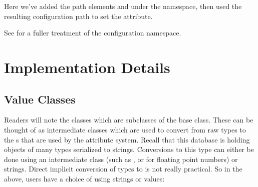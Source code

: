 \documentclass[letterpaper,10pt,english]{sphinxmanual}
\renewcommand{\sphinxcode}[1]{\texttt{\small{#1}}}
\begin{document}
Here we’ve added the path elements \sphinxcode{} and \sphinxcode{} under
the \sphinxcode{} namespace, then used the resulting configuration path
to set the attribute.

See {\hyperref[\detokenize{object-names:object-names}]{}} for a fuller treatment of the  configuration namespace.


\section{Implementation Details}
\label{\detokenize{attributes:implementation-details}}

\subsection{Value Classes}
\label{\detokenize{attributes:value-classes}}
Readers will note the \sphinxcode{} classes which are subclasses of the
\sphinxcode{} base class. These can be thought of as
intermediate classes which are used to convert from raw types to the
\sphinxcode{}s that are used by the attribute system.
Recall that this database is holding objects of many types serialized
to strings. Conversions to this type can either be done using
an intermediate class (such as \sphinxcode{},
or \sphinxcode{} for floating point numbers)
or  strings. Direct implicit conversion of types to
\sphinxcode{} is not really practical.
So in the above, users have a choice of using strings or values:

\begin{sphinxVerbatim}[commandchars=\\\{\}]
    
    
\end{sphinxVerbatim}
\end{document}
